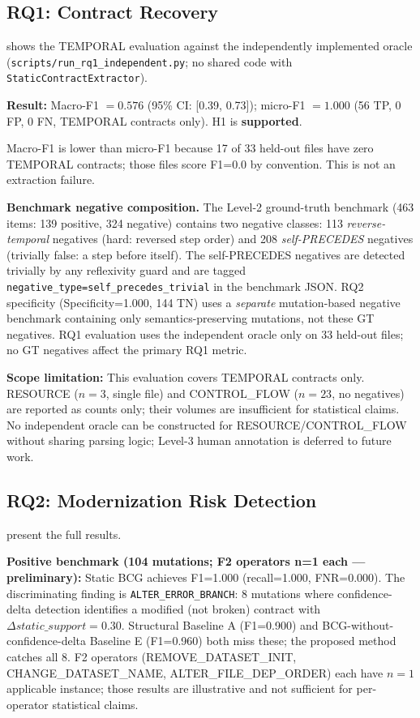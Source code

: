 \documentclass[sigconf,anonymous,review]{acmart}
\newcommand{\bcg}{\textsc{BCG}\xspace}
\begin{document}
\subsection{RQ1: Contract Recovery}

 shows the TEMPORAL evaluation against the independently implemented
oracle (\texttt{scripts/run\_rq1\_independent.py}; no shared code with
\texttt{StaticContractExtractor}).

\textbf{Result:} Macro-F1 $= 0.576$ (95\% CI: [0.39, 0.73]);
micro-F1 $= 1.000$ (56 TP, 0 FP, 0 FN, TEMPORAL contracts only).
H1 is \textbf{supported}.

Macro-F1 is lower than micro-F1 because 17 of 33 held-out files have zero TEMPORAL
contracts; those files score F1=0.0 by convention.
This is not an extraction failure.

\textbf{Benchmark negative composition.}
The Level-2 ground-truth benchmark (463 items: 139 positive, 324 negative) contains
two negative classes: 113 \emph{reverse-temporal} negatives (hard: reversed step
order) and 208 \emph{self-PRECEDES} negatives (trivially false: a step before itself).
The self-PRECEDES negatives are detected trivially by any reflexivity guard and are
tagged \texttt{negative\_type=self\_precedes\_trivial} in the benchmark JSON.
RQ2 specificity (Specificity=1.000, 144 TN) uses a \emph{separate} mutation-based
negative benchmark containing only semantics-preserving mutations, not these GT negatives.
RQ1 evaluation uses the independent oracle only on 33 held-out files; no GT negatives
affect the primary RQ1 metric.

\textbf{Scope limitation:}
This evaluation covers TEMPORAL contracts only.
RESOURCE ($n=3$, single file) and CONTROL\_FLOW ($n=23$, no negatives)
are reported as counts only; their volumes are insufficient for statistical claims.
No independent oracle can be constructed for RESOURCE/CONTROL\_FLOW without sharing
parsing logic; Level-3 human annotation is deferred to future work.



\subsection{RQ2: Modernization Risk Detection}

 present the full results.

\textbf{Positive benchmark (104 mutations; F2 operators n=1 each — preliminary):}
Static \bcg achieves F1=1.000 (recall=1.000, FNR=0.000).
The discriminating finding is \texttt{ALTER\_ERROR\_BRANCH}: 8 mutations where
confidence-delta detection identifies a modified (not broken) contract with
$\Delta\mathit{static\_support} = 0.30$.
Structural Baseline A (F1=0.900) and BCG-without-confidence-delta Baseline E
(F1=0.960) both miss these; the proposed method catches all 8.
F2 operators (REMOVE\_DATASET\_INIT, CHANGE\_DATASET\_NAME,
ALTER\_FILE\_DEP\_ORDER) each have $n=1$ applicable instance;
those results are illustrative and not sufficient for per-operator statistical claims.
\end{document}
